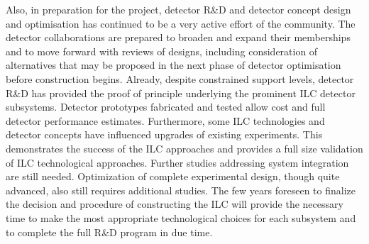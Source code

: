 \documentclass[%
 reprint,
 amsmath,amssymb,
 aps,
]{revtex4-1}
\newcommand{\todo}[1]{\textcolor{red}{{#1}}}
\begin{document}
Also, in preparation for the project, detector R\&D and detector concept design and optimisation has continued to be a very active
effort of the community.  The detector collaborations are prepared to broaden and expand their memberships and to move forward
with reviews of designs, including consideration of alternatives that may be proposed in the next phase of detector optimisation before construction begins. Already, despite constrained support levels, detector R\&D has provided the proof of principle underlying the prominent ILC detector subsystems. Detector prototypes fabricated and tested allow cost and full detector performance estimates. Furthermore, some ILC technologies and detector concepts have influenced upgrades of existing experiments.
This demonstrates the success of the ILC approaches and  provides a full size validation of ILC technological approaches. Further studies addressing system integration are still needed. Optimization of complete experimental design, though quite advanced, also still requires additional studies. The few years foreseen to finalize the decision and procedure of constructing the ILC will provide the necessary time to make the most appropriate technological choices for each subsystem and to complete the full R\&D program in due time.

\end{document}
